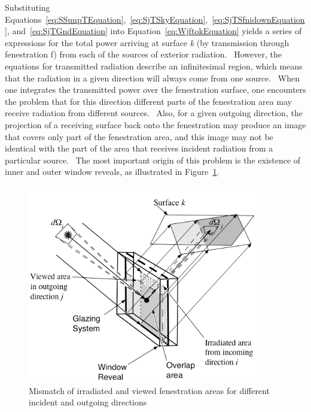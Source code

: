 Substituting Equations~\ref{eq:SSunpTEquation},~\ref{eq:SjTSkyEquation},~\ref{eq:SjTSfnidownEquation}, and~\ref{eq:SjTGndEquation} into Equation~\ref{eq:WjftokEquation} yields a series of expressions for the total power arriving at surface \emph{k} (by transmission through fenestration f) from each of the sources of exterior radiation.~ However, the equations for transmitted radiation describe an infinitesimal region, which means that the radiation in a given direction will always come from one source.~ When one integrates the transmitted power over the fenestration surface, one encounters the problem that for this direction different parts of the fenestration area may receive radiation from different sources.~ Also, for a given outgoing direction, the projection of a receiving surface back onto the fenestration may produce an image that covers only part of the fenestration area, and this image may not be identical with the part of the area that receives incident radiation from a particular source.~ The most important origin of this problem is the existence of inner and outer window reveals, as illustrated in Figure~\ref{fig:mismatch-of-irradiated-and-viewed}.

\begin{figure}[hbtp] %
\centering
\includegraphics[width=0.9\textwidth, height=0.9\textheight, keepaspectratio=true]{media/image1392.png}
\caption{Mismatch of irradiated and viewed fenestration areas for different incident and outgoing directions \protect \label{fig:mismatch-of-irradiated-and-viewed}}
\end{figure}

